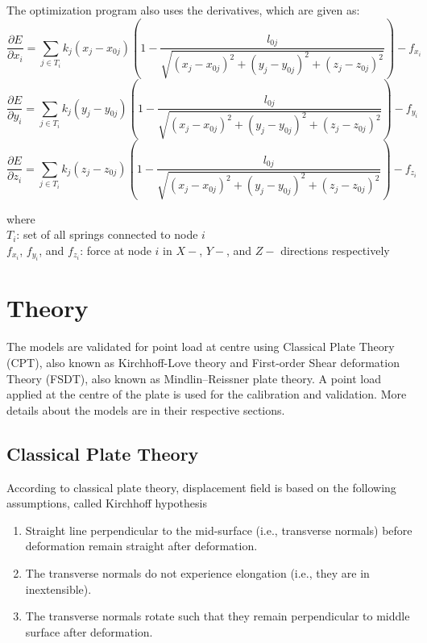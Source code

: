 The optimization program also uses the derivatives, which are given as:
\begin{equation}
    \frac{\partial E}{\partial x_i} = \sum_{j \in T_i} k_j(x_j - x_{0j})(1 - \frac{l_{0j}}{\sqrt{(x_j - x_{0j})^2 + (y_j - y_{0j})^2 + (z_j - z_{0j})^2}}) - f_{x_i}
\end{equation}
\begin{equation}
    \frac{\partial E}{\partial y_i} = \sum_{j \in T_i} k_j(y_j - y_{0j})(1 - \frac{l_{0j}}{\sqrt{(x_j - x_{0j})^2 + (y_j - y_{0j})^2 + (z_j - z_{0j})^2}}) - f_{y_i}
\end{equation}
\begin{equation}
    \frac{\partial E}{\partial z_i} = \sum_{j \in T_i} k_j(z_j - z_{0j})(1 - \frac{l_{0j}}{\sqrt{(x_j - x_{0j})^2 + (y_j - y_{0j})^2 + (z_j - z_{0j})^2}}) - f_{z_i}
\end{equation}

where\\
$T_i$: set of all springs connected to node $i$\\
$f_{x_i}$, $f_{y_i}$, and $f_{z_i}$: force at node $i$ in $X-$, $Y-$, and $Z-$ directions respectively

\section{Theory}
The models are validated for point load at centre using Classical Plate Theory (CPT), also known as Kirchhoff-Love theory and First-order Shear deformation Theory (FSDT), also known as Mindlin–Reissner plate theory. A point load applied at the centre of the plate is used for the calibration and validation. More details about the models are in their respective sections.

\subsection{Classical Plate Theory}
According to classical plate theory, displacement field is based on the following assumptions, called Kirchhoff hypothesis
\begin{enumerate}
    \item Straight line perpendicular to the mid-surface (i.e., transverse normals) before deformation remain straight after deformation.
    \item The transverse normals do not experience elongation (i.e., they are in inextensible).
    \item The transverse normals rotate such that they remain perpendicular to middle surface after deformation.
\end{enumerate}

